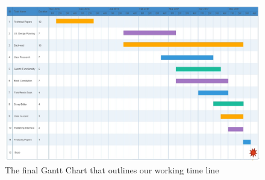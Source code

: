 \pagestyle{fancy}

\begin{figure}[th!]
	\centering
	\includegraphics[width=160mm]{papers/3b.gantt/ganttchart}
	\caption{The final Gantt Chart that outlines our working time line}
	\label{fig:ganttchart}
\end{figure}